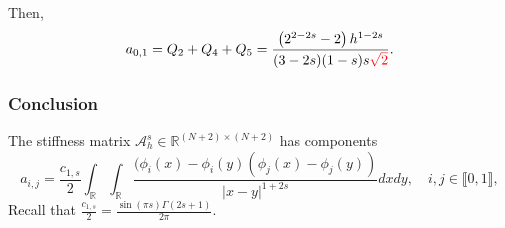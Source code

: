 \documentclass[10 pt]{article}
\newcommand\inter[1]{\llbracket #1\rrbracket}
\numberwithin{equation}{section}
\def\R{\mathbb{R}}
\newcommand{\B}[1]{{\color{red} #1}}  %
\begin{document}
Then,
\begin{align*}
a_{0,1}=Q_2+Q_4+Q_5=\frac{\left(2^{2-2 s}-2\right) h^{1-2 s}}{(3-2 s) (1-s) s\B{\sqrt{2}}}.
\end{align*}

\subsubsection{Conclusion}

The stiffness matrix $\mathcal A_h^s\in\mathbb R^{(N+2)\times (N+2)}$ has components
%
\begin{equation}\label{eq:def_aijs_s}
a_{i,j}=\frac{c_{1,s}}{2}\int_{\R}\int_{\R}\frac{(\phi_i(x)-\phi_i(y)(\phi_j(x)-\phi_j(y))}{|x-y|^{1+2s}}dx dy, \quad i,j\in\inter{0,1}, 
\end{equation}
Recall that $\frac{c_{1,s}}{2}=\frac{\sin (\pi  s) \Gamma (2 s+1)}{2\pi}$.
\end{document}
